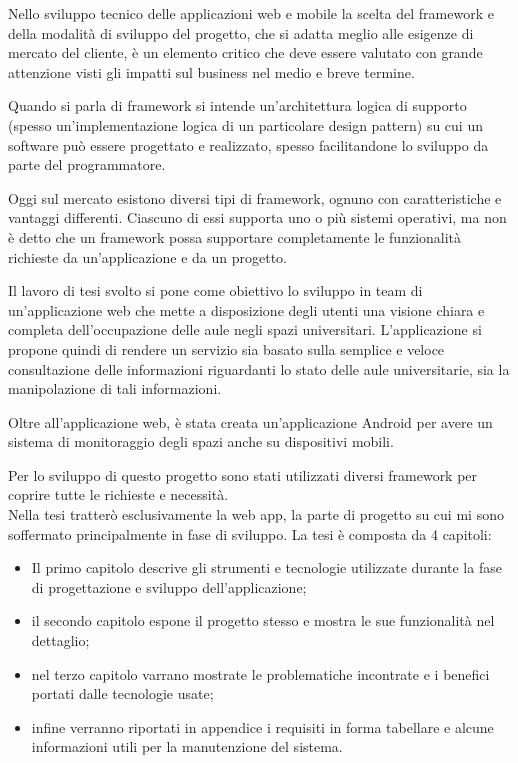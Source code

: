Nello sviluppo tecnico delle applicazioni web e mobile la scelta del framework e della modalità di sviluppo del progetto, che si adatta meglio alle esigenze di mercato del cliente, è un elemento critico che deve essere valutato con grande attenzione visti gli impatti sul business nel medio e breve termine.

Quando si parla di framework si intende un'architettura logica di supporto (spesso un'implementazione logica di un particolare design pattern) su cui un software può essere progettato e realizzato, spesso facilitandone lo sviluppo da parte del programmatore.

Oggi sul mercato esistono diversi tipi di framework, ognuno con caratteristiche e vantaggi differenti. Ciascuno di essi supporta uno o più sistemi operativi, ma non è detto che un framework possa supportare completamente le funzionalità richieste da un’applicazione e da un progetto.

Il lavoro di tesi svolto si pone come obiettivo lo sviluppo in team di un'applicazione web che mette a disposizione degli utenti una visione chiara e completa dell'occupazione delle aule negli spazi universitari. L'applicazione si propone quindi di rendere un servizio sia basato sulla semplice e veloce consultazione delle informazioni riguardanti lo stato delle aule universitarie, sia la manipolazione di tali informazioni.

Oltre all'applicazione web, è stata creata un'applicazione Android per avere un sistema di monitoraggio degli spazi anche su dispositivi mobili.

Per lo sviluppo di questo progetto sono stati utilizzati diversi framework per coprire tutte le richieste e necessità.\\ Nella tesi tratterò esclusivamente la web app, la parte di progetto su cui mi sono soffermato principalmente in fase di sviluppo.
\newpage La tesi è composta da 4 capitoli:
\begin{itemize}
\item Il primo capitolo descrive gli strumenti e tecnologie utilizzate durante la fase di progettazione e sviluppo dell'applicazione;
\item il secondo capitolo espone il progetto stesso e mostra le sue funzionalità nel dettaglio;
\item nel terzo capitolo varrano mostrate le problematiche incontrate e i benefici portati dalle tecnologie usate;
\item infine verranno riportati in appendice i requisiti in forma tabellare e alcune informazioni utili per la manutenzione del sistema.
\end{itemize}